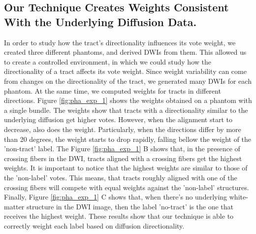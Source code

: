 \subsection{Our Technique Creates Weights Consistent With the Underlying
               Diffusion Data.}
In order to study how the tract's directionality influences its vote weight,
we created three different phantoms, and derived DWIs from them. This allowed us to
create a controlled environment, in which we could study how the directionality
of a tract affects its vote weight. Since weight variability can
come from changes on the directionality of the tract, we generated many DWIs
for each phantom. At the same time, we computed weights for tracts in different
directions. Figure \ref{fig:pha_exp_1} shows the weights obtained on a phantom
with a single bundle. The weights show that tracts with a directionality
similar to the underlying diffusion get higher votes. However, when the alignment
start to decrease, also does the weight. Particularly, when the directions
differ by more than 20 degrees, the weight starts to drop rapidly, falling bellow the weight of the
'non-tract' label.
The Figure \ref{fig:pha_exp_1} B shows that, in the presence of crossing fibers
in the DWI, tracts aligned with a crossing fibers get the highest weights.
It is important to notice that the highest weights are similar to those of the
'non-label' votes. This means, that tracts roughly aligned with one of the
crossing fibers will compete with equal weights against the 'non-label' structures.
Finally, Figure \ref{fig:pha_exp_1} C shows that, when there's no underlying
white-matter structure in the DWI image,
then the label 'no-tract' is the one that receives the highest weight. These
results show that our technique is able to correctly weight each label based
on diffusion directionality.


